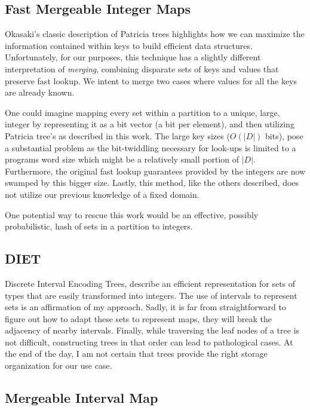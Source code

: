 \documentclass{article}
\begin{document}
\subsection{Fast Mergeable Integer Maps}

Okasaki's classic description\cite{Okasaki1998} of Patricia trees highlights how
we can maximize the information contained within keys to build efficient data
structures.
Unfortunately, for our purposes, this technique has a slightly different
interpretation of \emph{merging},
combining disparate sets of keys and values that preserve fast lookup.
We intent to merge two cases where values for all the keys are already known.

One could imagine mapping every set within a partition to a unique, large,
integer by representing it as a bit vector (a bit per element), and then
utilizing Patricia tree's as described in this work.
The large key sizes ($O(|D|)$ bits),
pose a substantial problem as the bit-twiddling necessary for look-ups is
limited to a programs word size which might be a relatively small portion
of $|D|$.
Furthermore, the original fast lookup guarantees provided by the integers are
now swamped by this bigger size.
Lastly, this method, like the others described, does not utilize our previous
knowledge of a fixed domain.

One potential way to rescue this work would be an effective,
possibly probabilistic,
hash of sets in a partition to integers.

\subsection{DIET}

Discrete Interval Encoding Trees\cite{Erwig1993},
describe an efficient representation for sets of types that are easily
transformed into integers.
The use of intervals to represent sets is an affirmation of my approach.
Sadly, it is far from straightforward to figure out how to adapt these
sets to represent maps,
they will break the adjacency of nearby intervals.
Finally,
while traversing the leaf nodes of a tree is not difficult,
constructing trees in that order can lead to pathological cases.
At the end of the day,
I am not certain that trees provide the right storage organization for our use
case.

\subsection{Mergeable Interval Map}
\end{document}
